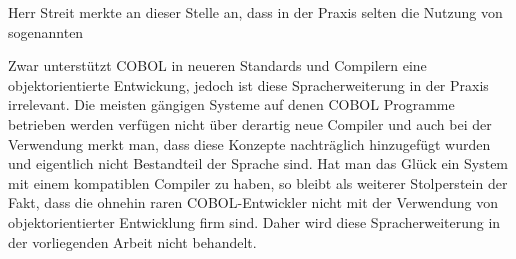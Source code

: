 Herr Streit merkte an dieser Stelle an, dass in der Praxis selten die Nutzung von sogenannten 

Zwar unterstützt COBOL in neueren Standards und Compilern eine objektorientierte Entwickung, jedoch ist diese Spracherweiterung in der Praxis irrelevant. Die meisten gängigen Systeme auf denen COBOL Programme betrieben werden verfügen nicht über derartig neue Compiler und auch bei der Verwendung merkt man, dass diese Konzepte nachträglich hinzugefügt wurden und eigentlich nicht Bestandteil der Sprache sind. Hat man das Glück ein System mit einem kompatiblen Compiler zu haben, so bleibt als weiterer Stolperstein der Fakt, dass die ohnehin raren COBOL-Entwickler nicht mit der Verwendung von objektorientierter Entwicklung firm sind. Daher wird diese Spracherweiterung in der vorliegenden Arbeit nicht behandelt. 